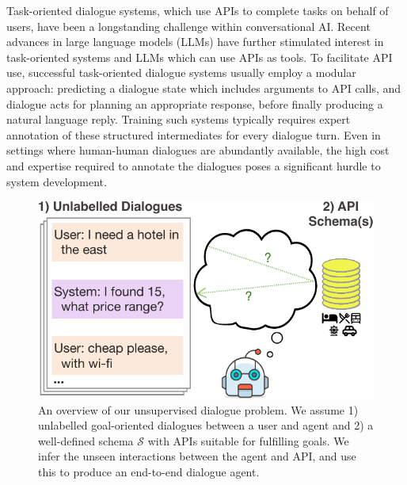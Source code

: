 \documentclass[11pt]{article}
\newcommand{\schema}[0]{\mathcal{S}}
\newcommand{\jmf}[1]{}
\begin{document}
\jmf{Add: Tool use with APIs is very important, and inferring API calls from unlabeled dialogues would be very helpful}Task-oriented dialogue systems, which use APIs to complete tasks on behalf of users, have been a longstanding challenge within conversational AI.
Recent advances in large language models (LLMs) have further stimulated interest in task-oriented systems and LLMs which can use APIs as tools.
To facilitate API use, successful task-oriented dialogue systems usually employ a modular approach:
predicting a dialogue state which includes arguments to API calls, and dialogue acts for planning an appropriate response, before finally producing a natural language reply.
Training such systems typically requires expert annotation of these structured intermediates for every dialogue turn.
Even in settings where human-human dialogues are abundantly available, the high cost and expertise required to annotate the dialogues poses a significant hurdle to system development.
\begin{figure}[t]
    \centering
    \includegraphics[width=\columnwidth]{imgs/fig_1_problem_v3.pdf}
    \caption{An overview of our unsupervised dialogue problem. We assume 1) unlabelled goal-oriented dialogues between a user and agent and 2) a well-defined schema $\schema$ with APIs suitable for fulfilling goals. We infer the unseen interactions between the agent and API, and use this to produce an end-to-end dialogue agent.}
    \label{fig:problem}
\end{figure}
\end{document}

